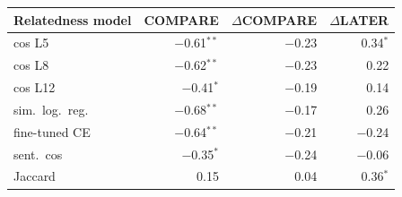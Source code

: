 \begin{tabular}{lrrr}
\toprule
Relatedness model & COMPARE & $\Delta$COMPARE & $\Delta$LATER \\
\midrule
cos L5 & $-$0.61$^{**}$ & $-$0.23\phantom{$^{**}$} & \phantom{$-$}0.34$^{*}$\phantom{$^{*}$} \\
cos L8 & $-$0.62$^{**}$ & $-$0.23\phantom{$^{**}$} & \phantom{$-$}0.22\phantom{$^{**}$} \\
cos L12 & $-$0.41$^{*}$\phantom{$^{*}$} & $-$0.19\phantom{$^{**}$} & \phantom{$-$}0.14\phantom{$^{**}$} \\
sim.\ log.\ reg. & $-$0.68$^{**}$ & $-$0.17\phantom{$^{**}$} & \phantom{$-$}0.26\phantom{$^{**}$} \\
fine-tuned CE & $-$0.64$^{**}$ & $-$0.21\phantom{$^{**}$} & $-$0.24\phantom{$^{**}$} \\
sent.\ cos & $-$0.35$^{*}$\phantom{$^{*}$} & $-$0.24\phantom{$^{**}$} & $-$0.06\phantom{$^{**}$} \\
Jaccard & \phantom{$-$}0.15\phantom{$^{**}$} & \phantom{$-$}0.04\phantom{$^{**}$} & \phantom{$-$}0.36$^{*}$\phantom{$^{*}$} \\
\bottomrule
\end{tabular}